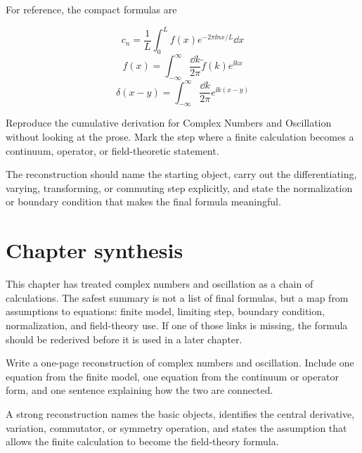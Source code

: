 For reference, the compact formulas are

\[
  c_n=\frac1L\int_0^L f(x)e^{-2\pi\ii nx/L}\dd x
\]
\[
  f(x)=\int_{-\infty}^{\infty}\frac{\dd k}{2\pi}\tilde f(k)e^{\ii kx}
\]
\[
  \delta(x-y)=\int_{-\infty}^{\infty}\frac{\dd k}{2\pi}e^{\ii k(x-y)}
\]

\begin{exercise}
Reproduce the cumulative derivation for Complex Numbers and Oscillation without looking at the prose.  Mark the step where a finite calculation becomes a continuum, operator, or field-theoretic statement.
\begin{answer}
The reconstruction should name the starting object, carry out the differentiating, varying, transforming, or commuting step explicitly, and state the normalization or boundary condition that makes the final formula meaningful.
\end{answer}
\end{exercise}



\section{Chapter synthesis}

This chapter has treated complex numbers and oscillation as a chain of calculations.  The safest summary is not a list of final formulas, but a map from assumptions to equations: finite model, limiting step, boundary condition, normalization, and field-theory use.  If one of those links is missing, the formula should be rederived before it is used in a later chapter.

\begin{exercise}
Write a one-page reconstruction of complex numbers and oscillation.  Include one equation from the finite model, one equation from the continuum or operator form, and one sentence explaining how the two are connected.
\begin{answer}
A strong reconstruction names the basic objects, identifies the central derivative, variation, commutator, or symmetry operation, and states the assumption that allows the finite calculation to become the field-theory formula.
\end{answer}
\end{exercise}
